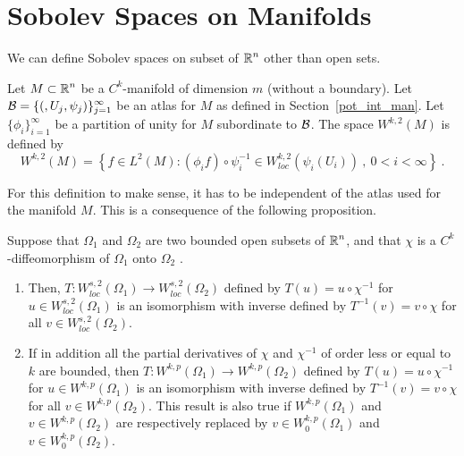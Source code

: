 \section{Sobolev Spaces on Manifolds}

We can define Sobolev spaces on subset of $\displaystyle \mathbb{R}^n$ other
than open sets.

\begin{defn} \label{sob_manifold}
Let $\displaystyle M\subset \mathbb{R}^n$ be a $\displaystyle C^k$-manifold
of dimension $m$ (without a boundary).  Let
$\displaystyle \mathcal{B} = \{ (,U_j,\psi_j) \}_{j=1}^\infty$ be an atlas for
$M$ as defined in Section~\ref{pot_int_man}.
Let $\displaystyle \{\phi_i\}_{i=1}^\infty$ be a partition of unity
for $M$ subordinate to $\mathcal{B}$.  The space
$\displaystyle W^{k,2}(M)$ is defined by 
\[
W^{k,2}(M) = \left\{ f \in L^2(M) : (\phi_i f) \circ \psi_i^{-1} \in
W^{k,2}_{loc}(\psi_i(U_i)) \ , \ 0<i<\infty \right\} \ .
\]
\end{defn}

For this definition to make sense, it has to be independent of the
atlas used for the manifold $M$.  This is a consequence of the
following proposition.

\begin{prop} \label{sob_cv}
Suppose that $\Omega_1$ and $\Omega_2$ are two bounded open subsets of
$\displaystyle \mathbb{R}^n$, and that $\chi$ is a
$\displaystyle C^k$-diffeomorphism of $\Omega_1$ onto $\Omega_2$ \footnotemark.
\begin{enumerate}
\item Then, $\displaystyle T:W_{loc}^{s,2}(\Omega_1) \to
 W_{loc}^{s,2}(\Omega_2)$ defined by
$\displaystyle T(u) = u \circ \chi^{-1}$ for
$\displaystyle u \in W_{loc}^{s,2}(\Omega_1)$ is an
isomorphism with inverse defined by
$\displaystyle T^{-1}(v) = v \circ \chi$ for all
$\displaystyle v \in W_{loc}^{s,2}(\Omega_2)$.
\item If in addition all the partial derivatives of $\chi$ and
$\displaystyle \chi^{-1}$ of order less or equal to $k$ are bounded, then
$\displaystyle T:W^{k,p}(\Omega_1) \to W^{k,p}(\Omega_2)$ defined by
$\displaystyle T(u) = u \circ \chi^{-1}$ for
$\displaystyle u \in W^{k,p}(\Omega_1)$
is an isomorphism with inverse defined by
$\displaystyle T^{-1}(v) = v \circ \chi$ for all
$\displaystyle v \in W^{k,p}(\Omega_2)$.
This result is also true if 
$\displaystyle W^{k,p}(\Omega_1)$ and $\displaystyle v \in W^{k,p}(\Omega_2)$
are respectively replaced by $\displaystyle v \in W^{k,p}_0(\Omega_1)$
and $\displaystyle v \in W^{k,p}_0(\Omega_2)$.
\end{enumerate}
\end{prop}

